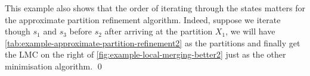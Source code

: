 \documentclass[a4paper,UKenglish,cleveref,autoref,thm-restate]{lipics-v2021}
\begin{document}
{\begin{example}
	This example also shows that the order of iterating through the states matters for the approximate partition refinement algorithm. Indeed, suppose we iterate though $s_1$ and $s_3$ before $s_2$ after arriving at the partition $X_1$, we will have \cref{tab:example-approximate-partition-refinement2} as the partitions and finally get the  LMC on the right of \cref{fig:example-local-merging-better2} just as the other minimisation algorithm. %
	\qed
	
\end{example}
}
\end{document}
